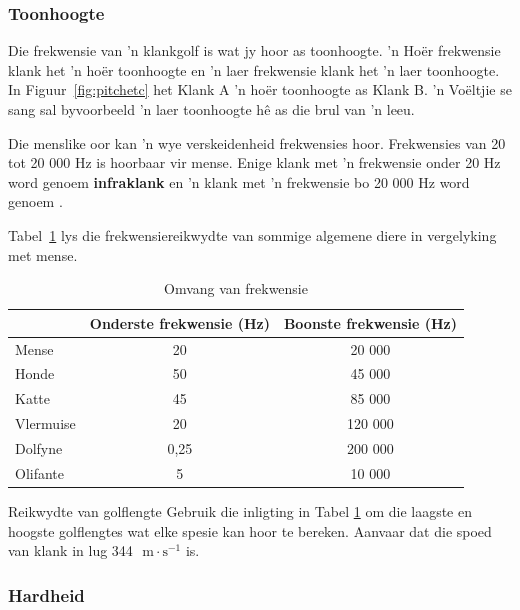             \subsubsection{Toonhoogte}
            \nopagebreak
            
Die frekwensie van 'n klankgolf is wat jy hoor as toonhoogte. 'n Ho\"er frekwensie klank het 'n ho\"er toonhoogte en 'n laer frekwensie klank het 'n laer toonhoogte. In Figuur~\ref{fig:pitchetc} het Klank A 'n ho\"er toonhoogte as Klank B. 'n Vo\"eltjie se sang sal byvoorbeeld 'n laer toonhoogte h\^e as die brul van 'n leeu.\par

Die menslike oor kan 'n wye verskeidenheid frekwensies hoor. Frekwensies van 20 tot 20 000 Hz is hoorbaar vir mense. Enige klank met 'n frekwensie onder 20 Hz word genoem \textbf{infraklank} en 'n klank met 'n frekwensie bo 20 000 Hz word genoem .\par


Tabel~\ref{p:wsl:s11:rangeoff} lys die frekwensiereikwydte van sommige algemene diere in vergelyking met mense.

\begin{table}[htbp]
\begin{center}
\caption{Omvang van frekwensie}
\label{p:wsl:s11:rangeoff}
\begin{tabular}{|l|c|c|}\hline
&Onderste frekwensie (Hz) & Boonste frekwensie (Hz)\\\hline\hline
Mense & 20 & 20 000\\\hline
Honde & 50 & 45 000\\\hline
Katte & 45 & 85 000\\\hline
Vlermuise & 20 & 120 000\\\hline
Dolfyne & 0,25 & 200 000\\\hline
Olifante & 5 & 10 000\\\hline
\hline
\end{tabular}
\end{center}
\end{table}
    \par
\begin{activity}{Reikwydte van golflengte}
\nopagebreak
Gebruik die inligting in Tabel \ref{p:wsl:s11:rangeoff} om die laagste en hoogste golflengtes wat elke spesie kan hoor te bereken. Aanvaar dat die spoed van klank in lug 344 $\text{ m} \cdot \text{s}^{-1}$ is.
\end{activity}
 
\subsubsection{Hardheid}
\nopagebreak

